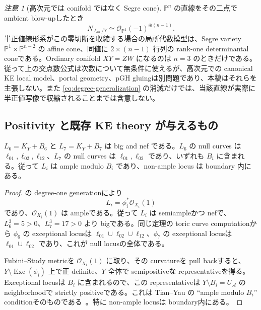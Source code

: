 \documentclass[11pt,a4paper]{ltjsarticle}
\newcommand{\PP}{\mathbb P}\newcommand{\RR}{\mathbb R}\newcommand{\CC}{\mathbb C}
\newcommand{\cA}{\mathcal A}\newcommand{\cB}{\mathcal B}\newcommand{\cC}{\mathcal C}
\theoremstyle{plain}
\theoremstyle{definition}
\theoremstyle{remark}
\newtheorem{remark}[theorem]{注意}\newtheorem{warning}[theorem]{警告}
\begin{document}
\begin{remark}[高次元では conifold ではなく Segre cone]
$\PP^n$ の直線をその二点で ambient blow-upしたとき
\[
 N_{\ell_{ab}/Y}\simeq\mathcal O_{\PP^1}(-1)^{\oplus(n-1)}.
\]
半正値線形系がこの零切断を収縮する場合の局所代数模型は、Segre variety
$\PP^1\times\PP^{n-2}$ の affine cone、同値に $2\times(n-1)$ 行列の rank-one determinantal coneである。Ordinary conifold $XY=ZW$ になるのは $n=3$ のときだけである。従って上の交点数公式は次数について無条件に使えるが、高次元での canonical KE local model、portal geometry、pGH gluingは別問題であり、本稿はそれらを主張しない。また \eqref{eq:degree-generalization} の消滅だけでは、当該直線が実際に半正値写像で収縮されることまでは含意しない。
\end{remark}

\subsection{Positivity と既存 KE theory が与えるもの}\label{subsec:existing-ke}
\begin{proposition}\label{prop:positivity}
$L_6=K_Y+B_6$ と $L_7=K_Y+B_7$ は big and nef である。$L_6$ の null curves は $\ell_{01},\ell_{02},\ell_{12}$、$L_7$ の null curves は $\ell_{01},\ell_{02}$ であり、いずれも $B_i$ に含まれる。従って $L_i$ は ample modulo $B_i$ であり、non-ample locus は boundary 内にある。
\end{proposition}

\begin{proof}
 の degree-one generationにより
\[
 L_i=\phi_i^*\mathcal O_{X_i}(1)
\]
であり、$\mathcal O_{X_i}(1)$ は ampleである。従って $L_i$ は semiampleかつ nefで、$L_6^3=5>0$、$L_7^3=17>0$ より bigである。同じ定理の toric curve computationから $\phi_6$ の exceptional locusは $\ell_{01}\cup\ell_{02}\cup\ell_{12}$、$\phi_7$ の exceptional locusは $\ell_{01}\cup\ell_{02}$ であり、これが null locusの全体である。

Fubini--Study metricを $\mathcal O_{X_i}(1)$ に取り、その curvatureを pull backすると、$Y\setminus\operatorname{Exc}(\phi_i)$ 上で正 definite、$Y$ 全体で semipositiveな representativeを得る。Exceptional locusは $B_i$ に含まれるので、この representativeは $Y\setminus B_i=U_{\cA}$ の neighborhoodで strictly positiveである。これは Tian--Yau の ``ample modulo $B_i$'' conditionそのものである~\cite{TY,Wu08}。特に non-ample locusは boundary内にある。
\end{proof}
\end{document}
